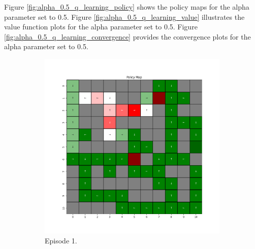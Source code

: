 \documentclass{assignment}
\begin{document}
Figure \ref{fig:alpha_0.5_q_learning_policy} shows the policy maps for the alpha parameter set to 0.5. Figure \ref{fig:alpha_0.5_q_learning_value} illustrates the value function plots for the alpha parameter set to 0.5. Figure \ref{fig:alpha_0.5_q_learning_convergence} provides the convergence plots for the alpha parameter set to 0.5.

\begin{figure}[H]
    \begin{subfigure}{0.3\textwidth}
        \includegraphics[width=\textwidth]{figures/policy_q/alpha_sweep/policy_alpha_0.5_gamma_0.95_epsilon_0.2_iteration_1.png}
    \caption{Episode 1.}
    \end{subfigure}\hfill
    \begin{subfigure}{0.3\textwidth}

\end{subfigure}
\end{figure}
\end{document}
